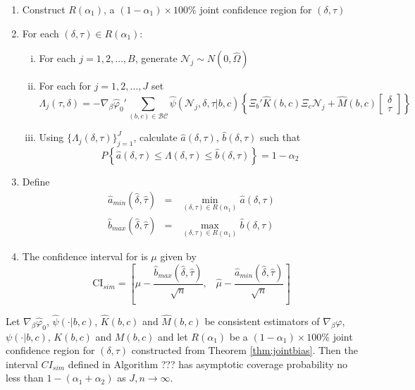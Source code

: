 \begin{alg}
\mbox{}
\begin{enumerate}
	\item Construct $ R(\alpha_1)$, a $(1-\alpha_1)\times 100\%$ joint confidence region for $(\delta,\tau)$ 
	\item For each $(\delta,\tau)\in R(\alpha_1)$:
		\begin{enumerate}[(i)]
			\item For each $j = 1, 2, \hdots, B$, generate $\mathscr{N}_j \sim N(0, \widehat{\Omega})$
			\item For each for $j = 1, 2, \hdots, J$ set $$\Lambda_j(\tau,\delta)= -\nabla_\beta\widehat{\varphi}_0' \sum_{(b,c) \in \mathcal{BC}} \widehat{\psi}(\mathscr{N}_j,\delta, \tau|b,c) \left\{\Xi_b' \widehat{K}(b,c) \Xi_c \mathscr{N}_j + \widehat{M}(b,c)  \left[\begin{array}{c}\delta \\ \tau \end{array} \right]\right\}$$
			\item Using $\{\Lambda_j(\delta, \tau)\}_{j=1}^J$, calculate $\widehat{a}(\delta,\tau)$, $\widehat{b}(\delta, \tau)$ such that
		$$P\left\{ \widehat{a}(\delta,\tau) \leq\Lambda(\delta,\tau)\leq \widehat{b}(\delta,\tau) \right\} = 1 - \alpha_2$$
		\end{enumerate}
	\item Define
			\begin{eqnarray*}
				\widehat{a}_{min}(\widehat{\delta}, \widehat{\tau})&=& \min_{(\delta,\tau) \in R(\alpha_1)} \widehat{a}(\delta,\tau)\\
				\widehat{b}_{max}(\widehat{\delta}, \widehat{\tau})&=& \max_{(\delta,\tau) \in R(\alpha_1)}\widehat{b}(\delta,\tau)
			\end{eqnarray*}
	\item The confidence interval for is $\mu$ given by
				$$\mbox{CI}_{sim}=\left[ \widehat{\mu} - \frac{\widehat{b}_{max}(\widehat{\delta}, \widehat{\tau})}{\sqrt{n}}, \;\;\; \widehat{\mu} - \frac{\widehat{a}_{min}(\widehat{\delta}, \widehat{\tau})}{\sqrt{n}} \right]$$
\end{enumerate}
\end{alg}

\begin{thm}
\label{pro:sim}
Let $\nabla_{\beta}\widehat{\varphi}_0$, $\widehat{\psi}(\cdot|b,c)$, $\widehat{K}(b,c)$ and $\widehat{M}(b,c)$ be consistent estimators of $\nabla_\beta \varphi$, $\psi(\cdot|b,c)$, $K(b,c)$ and $M(b,c)$ and let $R(\alpha_1)$ be a $(1-\alpha_1)\times 100\%$ joint confidence region for $(\delta,\tau)$ constructed from Theorem \ref{thm:jointbias}.
Then the interval $CI_{sim}$ defined in Algorithm ??? has asymptotic coverage probability no less than $1-\left( \alpha_1 + \alpha_2 \right)$ as $J,n\rightarrow \infty$. 
\end{thm}
